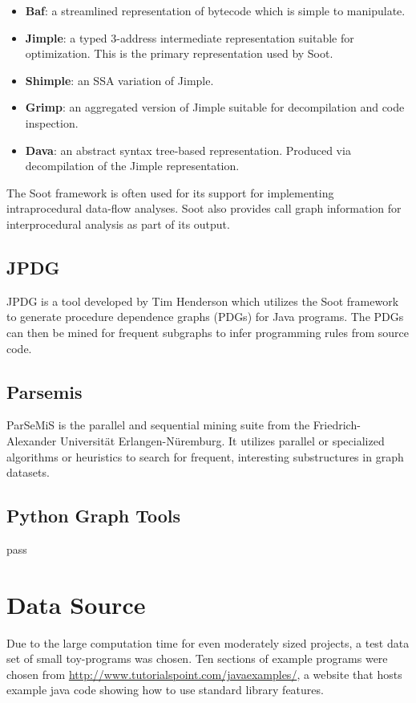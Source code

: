 \documentclass[12pt]{article}
\begin{document}
\begin{itemize}
    \item\textbf{Baf}: a streamlined representation of bytecode which is simple to manipulate.
    \item\textbf{Jimple}: a typed 3-address intermediate representation suitable for optimization. This is the primary representation used by Soot.
    \item\textbf{Shimple}: an SSA variation of Jimple.
    \item\textbf{Grimp}: an aggregated version of Jimple suitable for decompilation and code inspection.
    \item\textbf{Dava}: an abstract syntax tree-based representation. Produced via decompilation of the Jimple representation.
\end{itemize}
The Soot framework is often used for its support for implementing intraprocedural data-flow analyses. Soot also provides call graph information for interprocedural analysis as part of its output. 

\subsection{JPDG}
\label{subsection:JPDG}
JPDG is a tool developed by Tim Henderson which utilizes the Soot framework to generate procedure dependence graphs (PDGs) for Java programs. The PDGs can then be mined for frequent subgraphs to infer programming rules from source code.

\subsection{Parsemis}
ParSeMiS is the parallel and sequential mining suite from the Friedrich-Alexander Universit{\"a}t Erlangen-N{\"u}remburg. It utilizes parallel or specialized algorithms or heuristics to search for frequent, interesting substructures in graph datasets.

\subsection{Python Graph Tools}
pass

\section{Data Source}
Due to the large computation time for even moderately sized projects, a test data set of small toy-programs was chosen. Ten sections of example programs were chosen from \url{http://www.tutorialspoint.com/javaexamples/}, a website that hosts example java code showing how to use standard library features.
\end{document}
